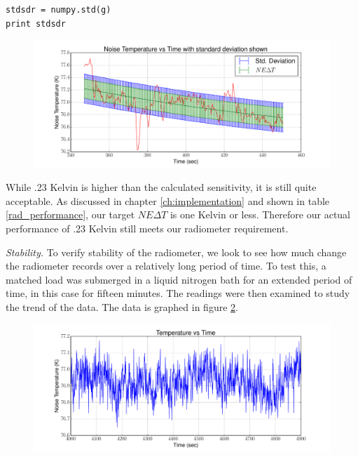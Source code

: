 {\begin{lstlisting}[frame=single,keywordstyle=\color{blue}]
stdsdr = numpy.std(g)
print stdsdr
\end{lstlisting}

\begin{figure}[h!tb] \centering
\includegraphics[width=\textwidth]{Experiments/Exp1/std_dev_errbar.pdf}
\label{sensitivity_exp_real}
\end{figure}

While .23 Kelvin is higher than the calculated sensitivity, it is still quite acceptable.  As discussed in chapter \ref{ch:implementation} and shown in table \ref{rad_performance}, our target $NE\Delta T$ is one Kelvin or less.  Therefore our actual performance of .23 Kelvin still meets our radiometer requirement.

\emph{Stability.}  To verify stability of the radiometer, we look to see how much change the radiometer records over a relatively long period of time.  To test this, a matched load was submerged in a liquid nitrogen bath for an extended period of time, in this case for fifteen minutes.  The readings were then examined to study the trend of the data.  The data is graphed in figure \ref{Stability}.

\begin{figure}[h!tb] \centering
\includegraphics[width=\textwidth]{Experiments/Exp2/sdr_calibrated_zoom.pdf}
\label{Stability}
\end{figure}

}
